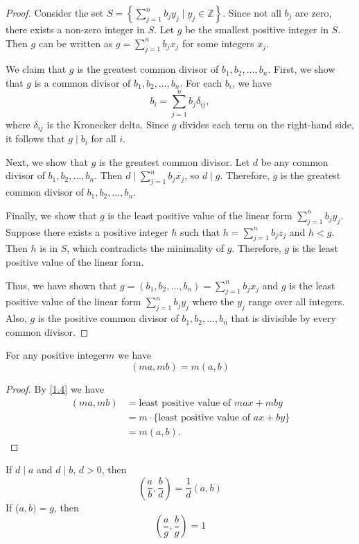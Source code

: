 \documentclass[11pt]{article}
\begin{document}
\begin{proof}
	Consider the set \( S = \left\{ \sum_{j=1}^{n} b_j y_j \mid y_j \in \mathbb{Z} \right\} \). Since not all \( b_j \) are zero, there exists a non-zero integer in \( S \). Let \( g \) be the smallest positive integer in \( S \). Then \( g \) can be written as \( g = \sum_{j=1}^{n} b_j x_j \) for some integers \( x_j \).

	We claim that \( g \) is the greatest common divisor of \( b_1, b_2, \ldots,
	b_n \). First, we show that \( g \) is a common divisor of \( b_1, b_2, \ldots,
	b_n \). For each \( b_i \), we have
	\[
		b_i = \sum_{j=1}^{n} b_j \delta_{ij},
	\]
	where \( \delta_{ij} \) is the Kronecker delta. Since \( g \) divides each term
	on the right-hand side, it follows that \( g \mid b_i \) for all \( i \).

	Next, we show that \( g \) is the greatest common divisor. Let \( d \) be any
	common divisor of \( b_1, b_2, \ldots, b_n \). Then \( d \mid \sum_{j=1}^{n}
	b_j x_j \), so \( d \mid g \). Therefore, \( g \) is the greatest common
	divisor of \( b_1, b_2, \ldots, b_n \).

	Finally, we show that \( g \) is the least positive value of the linear form \(
	\sum_{j=1}^{n} b_j y_j \). Suppose there exists a positive integer \( h \) such
	that \( h = \sum_{j=1}^{n} b_j z_j \) and \( h < g \). Then \( h \) is in \( S
	\), which contradicts the minimality of \( g \). Therefore, \( g \) is the
	least positive value of the linear form.

	Thus, we have shown that \( g = (b_1, b_2, \ldots, b_n) = \sum_{j=1}^{n} b_j
	x_j \) and \( g \) is the least positive value of the linear form \(
	\sum_{j=1}^{n} b_j y_j \) where the \( y_j \) range over all integers. Also, \(
	g \) is the positive common divisor of \( b_1, b_2, \ldots, b_n \) that is
	divisible by every common divisor.
\end{proof}

\begin{theorem}\label{1.6}
	For any positive integer\(m\) we have \[(ma, mb) = m(a, b)\]
\end{theorem}

\begin{proof}
	By \cref{1.4} we have
	\begin{align*}
		(ma, mb) & = \text{least positive value of } max + mby           \\
		         & = m \cdot \{\text{least positive value of } ax + by\} \\
		         & = m(a, b).
	\end{align*}
\end{proof}
\begin{theorem}\label{1.7}
	If \(d \mid a\) and \(d \mid b\), \(d > 0\), then \[(\frac{a}{b}, \frac{b}{d} ) = \frac{1}{d}(a, b)\]
	If (\(a, b) = g\), then \[(\frac{a}{g}, \frac{b}{g}) = 1\]
\end{theorem}
\end{document}
